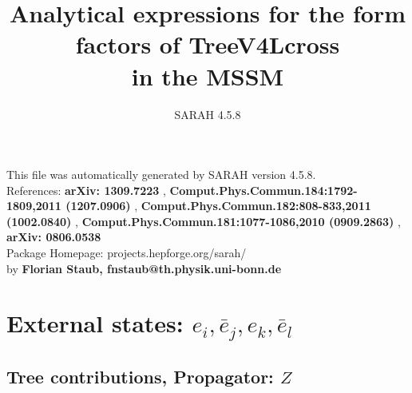 \documentclass[A4,landscape]{article}
\begin{document}
\title{Analytical expressions for the form factors of TreeV4Lcross\\ in the MSSM } 
 \author{SARAH 4.5.8} 
 \maketitle 
 \vspace{10cm} 
This file was automatically generated by SARAH version 4.5.8.  \\ 
References: {\bf arXiv: 1309.7223 }, {\bf Comput.Phys.Commun.184:1792-1809,2011 (1207.0906) }, {\bf Comput.Phys.Commun.182:808-833,2011 (1002.0840) }, {\bf Comput.Phys.Commun.181:1077-1086,2010 (0909.2863) }, {\bf arXiv: 0806.0538 } \\ 
Package Homepage: projects.hepforge.org/sarah/ \\ 
by {\bf Florian Staub, fnstaub@th.physik.uni-bonn.de} 
 \pagebreak 
 \tableofcontents 
 \pagebreak 
\section{External states: ${e_{{i}}, \bar{e}_{{j}}, e_{{k}}, \bar{e}_{{l}}}$} 
\subsection{Tree contributions, Propagator: $Z$} 
\end{document}
